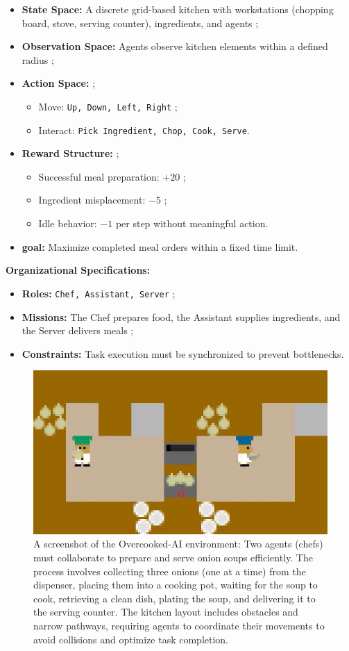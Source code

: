 \documentclass[pdflatex,sn-mathphys-num]{sn-jnl}%
\theoremstyle{thmstyleone}%
\theoremstyle{thmstyletwo}%
\theoremstyle{thmstylethree}%
\begin{document}
\begin{itemize}
    \item \textbf{State Space:} A discrete grid-based kitchen with workstations (chopping board, stove, serving counter), ingredients, and agents ;
    \item \textbf{Observation Space:} Agents observe kitchen elements within a defined radius ;
    \item \textbf{Action Space:}  ;
          \begin{itemize}
              \item Move: \texttt{Up, Down, Left, Right} ;
              \item Interact: \texttt{Pick Ingredient, Chop, Cook, Serve}.
          \end{itemize}
    \item \textbf{Reward Structure:} ;
          \begin{itemize}
              \item Successful meal preparation: $+20$ ;
              \item Ingredient misplacement: $-5$ ;
              \item Idle behavior: $-1$ per step without meaningful action.
          \end{itemize}
    \item \textbf{goal:} Maximize completed meal orders within a fixed time limit.
\end{itemize}

\textbf{Organizational Specifications:}
\begin{itemize}
    \item \textbf{Roles:} \texttt{Chef, Assistant, Server} ;
    \item \textbf{Missions:} The Chef prepares food, the Assistant supplies ingredients, and the Server delivers meals ;
    \item \textbf{Constraints:} Task execution must be synchronized to prevent bottlenecks.
\end{itemize}

\begin{figure}[h!]
    \centering
    \includegraphics[width=0.6\linewidth]{figures/overcooked.png}
    \caption{A screenshot of the Overcooked-AI environment: Two agents (chefs) must collaborate to prepare and serve onion soups efficiently. The process involves collecting three onions (one at a time) from the dispenser, placing them into a cooking pot, waiting for the soup to cook, retrieving a clean dish, plating the soup, and delivering it to the serving counter. The kitchen layout includes obstacles and narrow pathways, requiring agents to coordinate their movements to avoid collisions and optimize task completion.}
    \label{fig:overcooked}
\end{figure}
\end{document}
